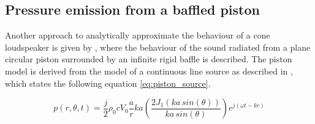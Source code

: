 \subsection{Pressure emission from a baffled piston}\label{ssec:piston}
Another  approach to analytically approximate the behaviour of a cone loudspeaker is given by \citep[p. 179 ff.]{Kinsler2000}, where the behaviour of the sound radiated from a plane circular piston surrounded by an infinite rigid baffle is described. The piston model is derived from the model of a continuous line source as described in \citep[p. 176 f.]{Kinsler2000}, which states the following equation \autoref{eq:piston_source}.



\begin{equation}\label{eq:piston_source}
p(r,\theta ,t)=\frac{j}{2} \rho_{0}c  V_{0}\frac{a}{r}ka \left ( \frac{2J_1(ka\, sin(\theta ))}{ka\, sin(\theta )} \right )e^{j(\omega t-kr)}
\end{equation}
\startexplain
\stopexplain

